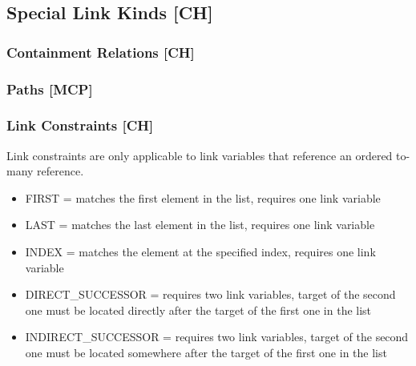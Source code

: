 \subsection{Special Link Kinds [CH]}

\subsubsection{Containment Relations [CH]}



\subsubsection{Paths [MCP]}

\subsubsection{Link Constraints [CH]}


Link constraints are only applicable to link variables that reference an ordered to-many reference. 
\begin{itemize}
  \item FIRST = matches the first element in the list, requires one link variable
  \item LAST = matches the last element in the list, requires one link variable
  \item INDEX = matches the element at the specified index, requires one link variable
  \item DIRECT\_SUCCESSOR = requires two link variables, target of the second one must be located directly after the target of the first one in the list
  \item INDIRECT\_SUCCESSOR = requires two link variables, target of the second one must be located somewhere after the target of the first one in the list
\end{itemize}



